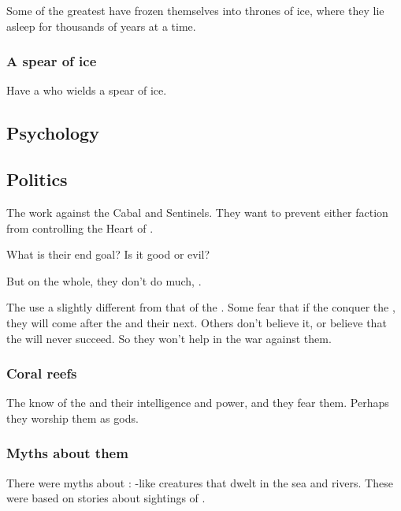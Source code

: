 Some of the greatest \nagalords{} have frozen themselves into thrones of ice, where they lie asleep for thousands of years at a time. 





\subsubsection{A spear of ice}
Have a \naga{} who wields a spear of ice. 








\subsection{Psychology}







\subsection{Politics}
The \nagae{} work against the Cabal and Sentinels. They want to prevent either faction from controlling the Heart of \Miith{}. 

What is their end goal? Is it good or evil? 

But on the whole, they don't do much, . 

The \nagae{} use a \dweomer{} slightly different from that of the \dragons. 
Some fear that if the \banes{} conquer the \dragons, they will come after the \nagae{} and their \dweomer{} next. 
Others don't believe it, or believe that the \banes{} will never succeed. 
So they won't help in the war against them. 





\subsubsection{Coral reefs}
The \nagae{} know of the  and their intelligence and power, and they fear them. 
Perhaps they worship them as gods. 





\subsubsection{Myths about them}
There were myths about : 
\Scatha-like creatures that dwelt in the sea and rivers. 
These were based on stories about sightings of \nagae. 

















